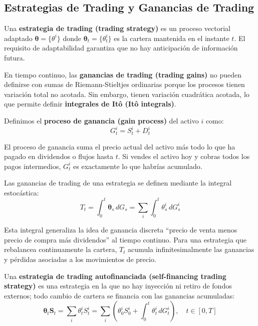 \documentclass[12pt]{article}
\begin{document}
\subsection{Estrategias de Trading y Ganancias de Trading}

Una \textbf{estrategia de trading (trading strategy)} es un proceso vectorial adaptado $\boldsymbol{\theta} = \{\theta^i\}$ donde $\boldsymbol{\theta}_t = \{\theta_t^i\}$ es la cartera mantenida en el instante $t$. El requisito de adaptabilidad garantiza que no hay anticipaci\'on de informaci\'on futura.

En tiempo continuo, las \textbf{ganancias de trading (trading gains)} no pueden definirse con sumas de Riemann-Stieltjes ordinarias porque los procesos tienen variaci\'on total no acotada. Sin embargo, tienen variaci\'on cuadr\'atica acotada, lo que permite definir \textbf{integrales de It\^o (It\^o integrals)}.

Definimos el \textbf{proceso de ganancia (gain process)} del activo $i$ como:
\begin{equation}
  G_t^i = S_t^i + D_t^i
\end{equation}

\begin{intuicionmat}
El proceso de ganancia suma el precio actual del activo m\'as todo lo que ha pagado en dividendos o flujos hasta $t$. Si vendes el activo hoy y cobras todos los pagos intermedios, $G_t^i$ es exactamente lo que habr\'ias acumulado.
\end{intuicionmat}

Las ganancias de trading de una estrategia se definen mediante la integral estoc\'astica:
\begin{equation}
  T_t = \int_0^t \boldsymbol{\theta}_s \, dG_s = \sum_i \int_0^t \theta_s^i \, dG_s^i
\end{equation}

\begin{intuicionmat}
Esta integral generaliza la idea de ganancia discreta ``precio de venta menos precio de compra m\'as dividendos'' al tiempo continuo. Para una estrategia que rebalancea continuamente la cartera, $T_t$ acumula infinitesimalmente las ganancias y p\'erdidas asociadas a los movimientos de precio.
\end{intuicionmat}

Una \textbf{estrategia de trading autofinanciada (self-financing trading strategy)} es una estrategia en la que no hay inyecci\'on ni retiro de fondos externos; todo cambio de cartera se financia con las ganancias acumuladas:
\begin{equation}
  \boldsymbol{\theta}_t \mathbf{S}_t = \sum_i \theta_t^i S_t^i = \sum_i \left(\theta_0^i S_0^i + \int_0^t \theta_t^i \, dG_t^i\right), \quad t \in [0,T]
\end{equation}
\end{document}
